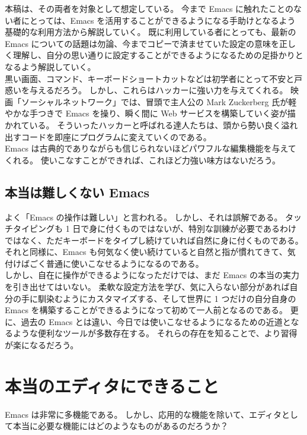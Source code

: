 本稿は、その両者を対象として想定している。
今まで Emacs に触れたことのない者にとっては、Emacs を活用することができるようになる手助けとなるよう基礎的な利用方法から解説していく。
既に利用している者にとっても、最新の Emacs についての話題は勿論、今までコピーで済ませていた設定の意味を正しく理解し、自分の思い通りに設定することができるようになるための足掛かりとなるよう解説していく。\\

黒い画面、コマンド、キーボードショートカットなどは初学者にとって不安と戸惑いを与えるだろう。
しかし、これらはハッカーに強い力を与えてくれる。
映画「ソーシャルネットワーク」では、冒頭で主人公の Mark Zuckerberg 氏が軽やかな手つきで Emacs を操り、瞬く間に Web サービスを構築していく姿が描かれている。
そういったハッカーと呼ばれる達人たちは、頭から勢い良く溢れ出すコードを即座にプログラムに変えていくのである。\\

Emacs は古典的でありながらも信じられないほどパワフルな編集機能を与えてくれる。
使いこなすことができれば、これほど力強い味方はないだろう。
\subsection{本当は難しくない Emacs}
よく「Emacs の操作は難しい」と言われる。
しかし、それは誤解である。
タッチタイピングも 1 日で身に付くものではないが、特別な訓練が必要であるわけではなく、ただキーボードをタイプし続けていれば自然に身に付くものである。
それと同様に、Emacs も何気なく使い続けていると自然と指が慣れてきて、気付けばごく普通に使いこなせるようになるのである。\\

しかし、自在に操作ができるようになっただけでは、まだ Emacs の本当の実力を引き出せてはいない。
柔軟な設定方法を学び、気に入らない部分があれば自分の手に馴染むようにカスタマイズする、そして世界に 1 つだけの自分自身の Emacs を構築することができるようになって初めて一人前となるのである。
更に、過去の Emacs とは違い、今日では使いこなせるようになるための近道となるような便利なツールが多数存在する。
それらの存在を知ることで、より習得が楽になるだろう。
\section{本当のエディタにできること}
Emacs は非常に多機能である。
しかし、応用的な機能を除いて、エディタとして本当に必要な機能にはどのようなものがあるのだろうか？
